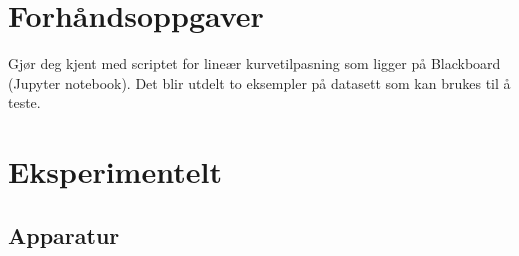 \documentclass[../Elmag-labhefte-2020.tex]{subfiles}
\begin{document}






\section{Forhåndsoppgaver}
Gjør deg kjent med scriptet for lineær kurvetilpasning som ligger på Blackboard (Jupyter notebook). Det blir utdelt to eksempler på datasett som kan brukes til å teste. 

\section{Eksperimentelt \label{ch.kraft.eksp} }

\subsection{Apparatur}
\end{document}
